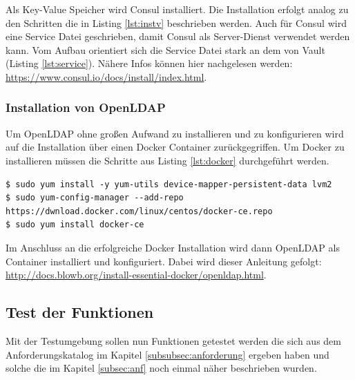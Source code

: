 \documentclass[
book,
a4paper,   
titlepage,  
halfparskip,
12pt        
]{scrartcl}
\begin{document}
\begin{onehalfspacing}
Als Key-Value Speicher wird Consul installiert. Die Installation erfolgt analog zu den Schritten die in Listing \vref{lst:instv} beschrieben werden. Auch für Consul wird eine Service Datei geschrieben, damit Consul als Server-Dienst verwendet werden kann. Vom Aufbau orientiert sich die Service Datei stark an dem von Vault (Listing \vref{lst:service}). Nähere Infos können hier nachgelesen werden: \url{https://www.consul.io/docs/install/index.html}.

\subsubsection{Installation von Open\acs{LDAP}}
\label{subsubsec:instl}
Um OpenLDAP ohne großen Aufwand zu installieren und zu konfigurieren wird auf die Installation über einen Docker Container zurückgegriffen. Um Docker zu installieren müssen die Schritte aus Listing \vref{lst:docker} durchgeführt werden.

\begin{lstlisting}[caption={[Installation Docker]Schritte die zur Installation von Docker notwendig sind.\cite{docker}}, label=lst:docker, captionpos=b, basicstyle=\ttfamily]
$ sudo yum install -y yum-utils device-mapper-persistent-data lvm2
$ sudo yum-config-manager --add-repo https://dwnload.docker.com/linux/centos/docker-ce.repo
$ sudo yum install docker-ce
\end{lstlisting}

Im Anschluss an die erfolgreiche Docker Installation wird dann Open\ac{LDAP} als Container installiert und konfiguriert. Dabei wird dieser Anleitung gefolgt: \url{http://docs.blowb.org/install-essential-docker/openldap.html}.

\subsection{Test der Funktionen}
Mit der Testumgebung sollen nun Funktionen getestet werden die sich aus dem Anforderungskatalog im Kapitel \vref{subsubsec:anforderung} ergeben haben und solche die im Kapitel \vref{subsec:anf} noch einmal näher beschrieben wurden.


\end{onehalfspacing}
\end{document}
